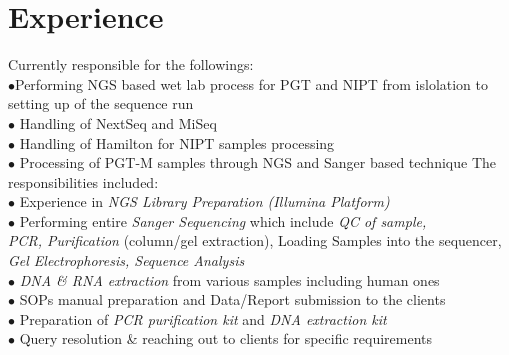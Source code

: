 \documentclass[letterpaper]{twentysecondcv} %
\begin{document}

\section{Experience}

\begin{twenty} %
	{Currently responsible for the followings:\\
	$\bullet$Performing NGS based wet lab process for PGT and NIPT from \phantom{ix}islolation to setting up of the sequence run \\
	$\bullet$ Handling of NextSeq and MiSeq\\
	$\bullet$ Handling of Hamilton for NIPT samples processing\\
	$\bullet$ Processing of PGT-M samples through NGS and Sanger based \phantom{ix}technique
	}
	{The responsibilities included:\\
	$\bullet$ Experience in \emph{ NGS Library Preparation (Illumina Platform)} \\
	$\bullet$ Performing entire \emph{ Sanger Sequencing} which include \emph{QC of sample,\\ \phantom{i}  PCR, Purification} (column/gel extraction), Loading Samples into \phantom{ix}the sequencer,\emph{ Gel Electrophoresis, Sequence Analysis}\\
	$\bullet$ \emph{ DNA \& RNA extraction} from various samples including human ones\\
	$\bullet$ SOPs manual preparation and Data/Report submission to the clients\\
	$\bullet$ Preparation of\emph{ PCR purification kit} and \emph{ DNA extraction kit}\\
	$\bullet$ Query resolution \& reaching out to clients for specific requirements\\
	}

\end{twenty}
\end{document}
